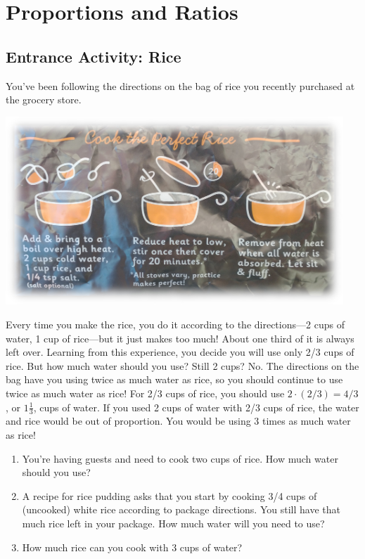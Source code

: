 \fi

\wbnewpage
\section{Proportions and Ratios}\label{sec:Ratios}

\subsection{Entrance Activity: Rice}
You've been following the directions on the bag of rice you recently purchased at the grocery store.
\begin{center}
\includegraphics[width=5in]{images/RiceBag}
\par\end{center}
Every time you make the rice, you do it according to the directions---2 cups of water, 1 cup of rice---but it just makes too much! About one third of it is always left over. Learning from this experience, you decide you will use only 2/3 cups of rice. But how much water should you use? Still 2 cups? No. The directions on the bag have you using twice as much water as rice, so you should continue to use twice as much water as rice! For 2/3 cups of rice, you should use $2\cdot(2/3)=4/3$, or $1\frac13$, cups of water. If you used 2 cups of water with 2/3 cups of rice, the water and rice would be out of proportion. You would be using 3 times as much water as rice!
\begin{enumerate}
\item You're having guests and need to cook two cups of rice. How much water should you use?\wbvfill
\item A recipe for rice pudding asks that you start by cooking 3/4 cups of (uncooked) white rice according to package directions. You still have that much rice left in your package. How much water will you need to use?\wbvfill
\item How much rice can you cook with 3 cups of water?\\\wbvfill
\end{enumerate}

